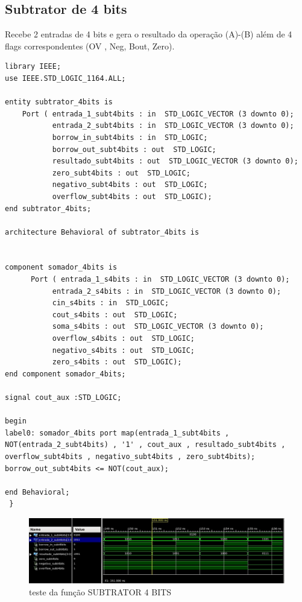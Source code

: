 \documentclass[a4paper,12pt,twoside]{article}
\begin{document}
 
\subsection{Subtrator de 4 bits}
Recebe 2 entradas de 4 bits e gera o resultado da operação  (A)-(B) além de 4 flags correspondentes (OV , Neg, Bout, Zero).

\begin{lstlisting}
library IEEE;
use IEEE.STD_LOGIC_1164.ALL;

entity subtrator_4bits is
    Port ( entrada_1_subt4bits : in  STD_LOGIC_VECTOR (3 downto 0);
           entrada_2_subt4bits : in  STD_LOGIC_VECTOR (3 downto 0);
           borrow_in_subt4bits : in  STD_LOGIC;
           borrow_out_subt4bits : out  STD_LOGIC;
           resultado_subt4bits : out  STD_LOGIC_VECTOR (3 downto 0);
           zero_subt4bits : out  STD_LOGIC;
           negativo_subt4bits : out  STD_LOGIC;
           overflow_subt4bits : out  STD_LOGIC);
end subtrator_4bits;

architecture Behavioral of subtrator_4bits is


component somador_4bits is
      Port ( entrada_1_s4bits : in  STD_LOGIC_VECTOR (3 downto 0);
           entrada_2_s4bits : in  STD_LOGIC_VECTOR (3 downto 0);
           cin_s4bits : in  STD_LOGIC;
           cout_s4bits : out  STD_LOGIC;
           soma_s4bits : out  STD_LOGIC_VECTOR (3 downto 0);
           overflow_s4bits : out  STD_LOGIC;
           negativo_s4bits : out  STD_LOGIC;
           zero_s4bits : out  STD_LOGIC);
end component somador_4bits;

signal cout_aux :STD_LOGIC;

begin
label0: somador_4bits port map(entrada_1_subt4bits , NOT(entrada_2_subt4bits) , '1' , cout_aux , resultado_subt4bits , overflow_subt4bits , negativo_subt4bits , zero_subt4bits);   
borrow_out_subt4bits <= NOT(cout_aux);

end Behavioral;
 } \end{lstlisting}
   \begin{figure}[H]
\centering
\includegraphics[scale=0.6]{testes/SUBTRATOR2.jpeg}
\caption{teste da função SUBTRATOR 4 BITS}
\label{fig:diagrama}
\end{figure}
\end{document}
